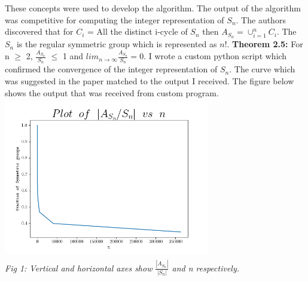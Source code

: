 \documentclass{IEEEtran}
\begin{document}
These concepts were used to develop the algorithm. The  output of the algorithm was competitive for computing the integer representation of $S_n$. The authors discovered that for $C_i$ = All the distinct i-cycle of $S_n$ then $A_{S_n} = \cup^{n}_{i = 1} C_i$. The $S_n$ is the regular symmetric group which is represented as $n!$. \newline
\textbf{Theorem 2.5:} For n \(\geq\) 2, \(\frac{A_{S_n}}{S_n}\) \(\leq\) 1 and $lim_{n \to \infty} \frac{A_{S_n}}{S_n} = 0$. \newline
I wrote a custom python script which confirmed the convergence of the integer representation of $S_n$. The curve which was suggested in the paper matched to the output I received. The figure below shows the output that was received from custom program. \newline
\includegraphics[width=9cm, height=7cm]{alg_suraj.png} \\
\textit{Fig 1: Vertical and horizontal axes show $\frac{|A_{S_n}|}{|S_n|} $ and n respectively.} \newline
\end{document}
